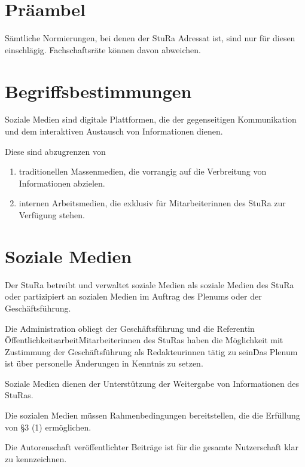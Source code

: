 \setcounter{section}{0}
\begin{multicols}{2}

\section{Präambel}
\Abs \Satz Sämtliche Normierungen, bei denen der StuRa Adressat ist, sind nur für diesen einschlägig. \Satz Fachschaftsräte können davon abweichen.

\section{Begriffsbestimmungen}
\Abs \Satz Soziale Medien sind digitale Plattformen, die der gegenseitigen Kommunikation und dem interaktiven Austausch von Informationen dienen.

\Abs \Satz Diese sind abzugrenzen von
\begin{enumerate}
\item traditionellen Massenmedien, die vorrangig auf die Verbreitung von Informationen abzielen. 
\item internen Arbeitsmedien, die exklusiv für Mitarbeiterinnen des StuRa zur Verfügung stehen.
\end{enumerate}

\section {Soziale Medien}
\Abs \Satz Der StuRa betreibt und verwaltet soziale Medien als soziale Medien des StuRa oder partizipiert an sozialen Medien im Auftrag des Plenums oder der Geschäftsführung.

\Abs \Satz Die Administration obliegt der Geschäftsführung und die Referentin Öffentlichkeitsarbeit\. Mitarbeiterinnen des StuRas haben die Möglichkeit mit Zustimmung der Geschäftsführung als Redakteurinnen tätig zu sein\. Das Plenum ist über personelle Änderungen in Kenntnis zu setzen.

\Abs \Satz Soziale Medien dienen der Unterstützung der Weitergabe von Informationen des StuRas.

\Abs \Satz Die sozialen Medien müssen Rahmenbedingungen bereitstellen, die die Erfüllung von §3 (1) ermöglichen.

\Abs \Satz Die Autorenschaft veröffentlichter Beiträge ist für die gesamte Nutzerschaft klar zu kennzeichnen.


\end{multicols}
